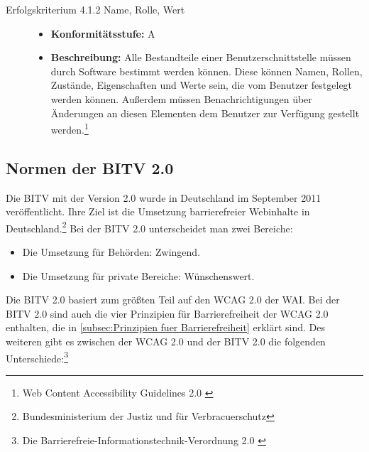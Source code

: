\begin{description}
\begin{description}
		\item[Erfolgskriterium 4.1.2 Name, Rolle, Wert]\hfill
		\begin{itemize}
			\item \textbf{Konformitätsstufe:} A
			\item \textbf{Beschreibung:} Alle Bestandteile einer Benutzerschnittstelle müssen durch Software bestimmt werden können. Diese können 
			Namen, Rollen, Zustände, Eigenschaften und Werte sein, die vom Benutzer festgelegt werden können. Außerdem müssen Benachrichtigungen über Änderungen 
			an diesen Elementen dem Benutzer zur Verfügung gestellt werden.\footnote{Web Content Accessibility Guidelines 2.0 \cite{WCAG2.0}}
		\end{itemize}
	\end{description}
\end{description}

\subsection{Normen der \ac{BITV} 2.0}
Die \ac{BITV} mit der Version 2.0 wurde in Deutschland im September 2011 veröffentlicht. Ihre Ziel ist die Umsetzung barrierefreier Webinhalte in Deutschland.\footnote{Bundesministerium der Justiz und für Verbracuerschutz\cite{BITV}} Bei der \ac{BITV} 2.0 unterscheidet man zwei Bereiche:

\begin{itemize}
	\item Die Umsetzung für Behörden: Zwingend.
	\item Die Umsetzung für private Bereiche: Wünschenswert.
\end{itemize}

Die \ac{BITV} 2.0 basiert zum größten Teil auf den \ac{WCAG} 2.0 der \ac{WAI}. Bei der \ac{BITV} 2.0 sind auch die vier Prinzipien für Barrierefreiheit der \ac{WCAG} 2.0  enthalten, die in \cref{subsec:Prinzipien fuer Barrierefreiheit} erklärt sind. Des weiteren gibt es zwischen der \ac{WCAG} 2.0 und der \ac{BITV} 2.0 die folgenden Unterschiede:\footnote{Die Barrierefreie-Informationstechnik-Verordnung 2.0 \cite{BITV}}

